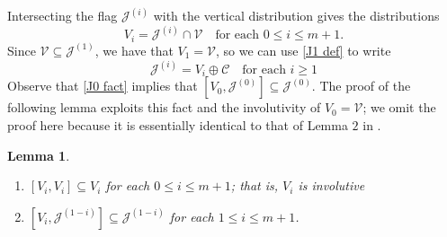 \documentclass[11pt,letterpaper]{amsart}
\newtheorem{lemma}[theorem]{Lemma}
\numberwithin{equation}{section}
\begin{document}
Intersecting the flag ${\mathcal{J}^{(i)}}$ with the vertical distribution gives the distributions
\begin{equation}
    \label{def V_i}
    V_i = \mathcal{J}^{(i)}\cap \mathcal V \quad\text{for each }0\leq i \leq m+1.
\end{equation}
Since $\mathcal{V}\subseteq \mathcal{J}^{(1)}$, we have that $V_1=\mathcal V$, so we can use \eqref{J1 def} to write
\begin{equation}
    \label{J(i) = V_i + C}
    \mathcal{J}^{(i)} = V_i\oplus \mathcal{C}\quad\text{for each }i\geq 1
\end{equation}
Observe that \eqref{J0 fact} implies that $[V_0,\mathcal{J}^{(0)}]\subseteq \mathcal{J}^{(0)}$. The proof of the following lemma exploits this fact and the involutivity of $V_0=\mathcal{V}$; we omit the proof here because it is essentially identical to that of Lemma $2$ in \cite{doubrov2009london}.
\begin{lemma}
    \label{Lemma: invol cond} 
    {\ }
    \begin{enumerate}
        \item $[V_i,V_i]\subseteq V_i$ for each $0\leq i \leq m+1$; that is, $V_i$ is involutive
        \item $[V_i,\mathcal{J}^{(1-i)}]\subseteq \mathcal{J}^{(1-i)}$ for each $1\leq i \leq m+1$.
    \end{enumerate}
\end{lemma}
\end{document}
